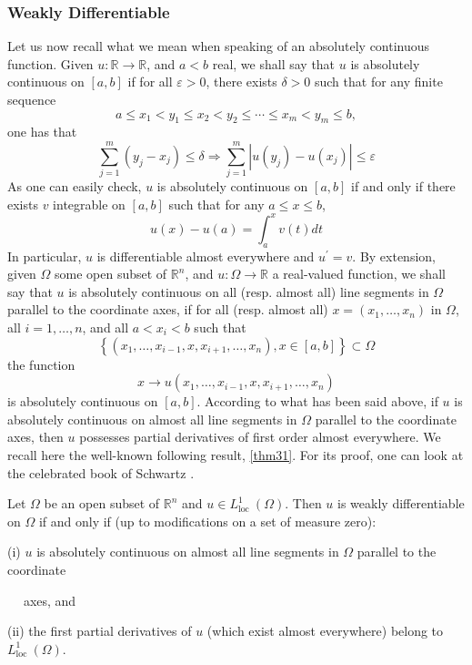\documentclass[12pt,hyperref,a4paper,UTF8]{ctexart}
\begin{document}
\subsubsection{Weakly Differentiable}
Let us now recall what we mean when speaking of an absolutely continuous function. Given $u: \mathbb{R} \rightarrow \mathbb{R}$, and $a<b$ real, we shall say that $u$ is absolutely continuous on $[a, b]$ if for all $\varepsilon>0$, there exists $\delta>0$ such that for any finite sequence
$$
a \leq x_1<y_1 \leq x_2<y_2 \leq \cdots \leq x_m<y_m \leq b,
$$
one has that
$$
\sum_{j=1}^m\left(y_j-x_j\right) \leq \delta \Rightarrow \sum_{j=1}^m\left|u\left(y_j\right)-u\left(x_j\right)\right| \leq \varepsilon
$$
As one can easily check, $u$ is absolutely continuous on $[a, b]$ if and only if there exists $v$ integrable on $[a, b]$ such that for any $a \leq x \leq b$,
$$
u(x)-u(a)=\int_a^x v(t) d t
$$
In particular, $u$ is differentiable almost everywhere and $u^{\prime}=v$. By extension, given $\Omega$ some open subset of $\mathbb{R}^n$, and $u: \Omega \rightarrow \mathbb{R}$ a real-valued function, we shall say that $u$ is absolutely continuous on all (resp. almost all) line segments in $\Omega$ parallel to the coordinate axes, if for all (resp. almost all) $x=\left(x_1, \ldots, x_n\right)$ in $\Omega$, all $i=1, \ldots, n$, and all $a<x_i<b$ such that
$$
\left\{\left(x_1, \ldots, x_{i-1}, x, x_{i+1}, \ldots, x_n\right), x \in[a, b]\right\} \subset \Omega
$$
the function
$$
x \rightarrow u\left(x_1, \ldots, x_{i-1}, x, x_{i+1}, \ldots, x_n\right)
$$
is absolutely continuous on $[a, b]$. According to what has been said above, if $u$ is absolutely continuous on almost all line segments in $\Omega$ parallel to the coordinate axes, then $u$ possesses partial derivatives of first order almost everywhere. We recall here the well-known following result, \autoref{thm31}. For its proof, one can look at the celebrated book of Schwartz \cite{Schwartz}.

\begin{Theorem}
    Let $\Omega$ be an open subset of $\mathbb{R}^n$ and $u \in L_{\text {loc }}^1(\Omega)$. Then $u$ is weakly differentiable on $\Omega$ if and only if (up to modifications on a set of measure zero):

    (i) $u$ is absolutely continuous on almost all line segments in $\Omega$ parallel to the coordinate 
    
    $\quad\;$axes, and

    (ii) the first partial derivatives of $u$ (which exist almost everywhere) belong to $L_{\text {loc }}^1(\Omega)$.
\label{thm31}
\end{Theorem}
\end{document}
